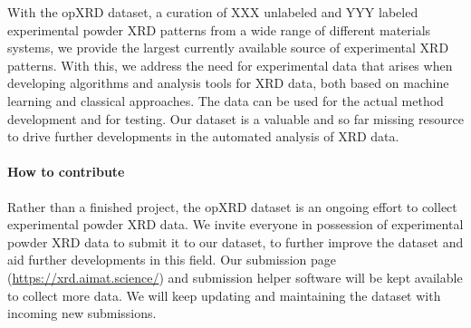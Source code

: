 With the opXRD dataset, a curation of XXX unlabeled and YYY labeled experimental powder XRD patterns from a wide range of different materials systems, we provide the largest currently available source of experimental XRD patterns. With this, we address the need for experimental data that arises when developing algorithms and analysis tools for XRD data, both based on machine learning and classical approaches. The data can be used for the actual method development and for testing. Our dataset is a valuable and so far missing resource to drive further developments in the automated analysis of XRD data.

\paragraph{How to contribute}

Rather than a finished project, the opXRD dataset is an ongoing effort to collect experimental powder XRD data. We invite everyone in possession of experimental powder XRD data to submit it to our dataset, to further improve the dataset and aid further developments in this field. Our submission page (\url{https://xrd.aimat.science/}) and submission helper software will be kept available to collect more data. We will keep updating and maintaining the dataset with incoming new submissions.

